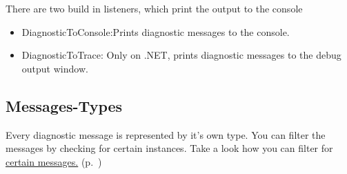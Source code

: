 There are two build in listeners, which print the output to the console

\begin{itemize}
\item DiagnosticToConsole:Prints diagnostic messages to the console.
\item DiagnosticToTrace: Only on .NET, prints diagnostic messages to the debug output window.
\end{itemize}

\subsection*{Messages-Types}

Every diagnostic message is represented by it's own type. You can filter the messages by checking for certain instances. Take a look how you can filter for \hyperref[ref:advanced-topics-diagnostics-diagnostic-messages-filter]{certain messages.} (p.~\pageref{ref:advanced-topics-diagnostics-diagnostic-messages-filter})


